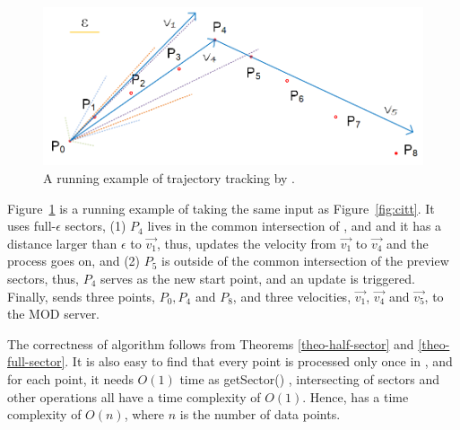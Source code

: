 \begin{figure}[tb!]
	\centering
	\includegraphics[scale=1.0]{figures/Fig-SITT.png}
	\vspace{-2ex}
	\caption{\small A running example of trajectory tracking by \sitt.  }
	\vspace{-2ex}
	\label{fig:sitt}
\end{figure}

\begin{example}
Figure~\ref{fig:sitt} is a running example of \sitt taking the same input as Figure~\ref{fig:citt}. It uses full-$\epsilon$ sectors, (1) $P_4$ lives in the common intersection of ,  and  and it has a \ped distance larger than $\epsilon$ to $\vec{v_1}$, thus, \sitt updates the velocity from $\vec{v_1}$ to $\vec{v_4}$ and the process goes on, and (2) $P_5$ is outside of the common intersection of the preview sectors, thus, $P_4$ serves as the new start point, and an update is triggered. Finally, \sitt sends three points, $P_0, P_4$ and $P_8$, and three velocities, $\vec{v_1}$, $\vec{v_4}$ and $\vec{v_5}$, to the MOD server. 
\end{example}



The correctness of algorithm \sitt follows from Theorems \ref{theo-half-sector} and \ref{theo-full-sector}.
It is also easy to find that every point is processed only once in \sitt, and for each point, it needs $O(1)$ time as getSector() \cite{Zhao:Sleeve}, intersecting of sectors \cite{Zhao:Sleeve} and {other operations} all have a time complexity of $O(1)$. Hence, \sitt has a time complexity of $O(n)$, where $n$ is the number of data points.



